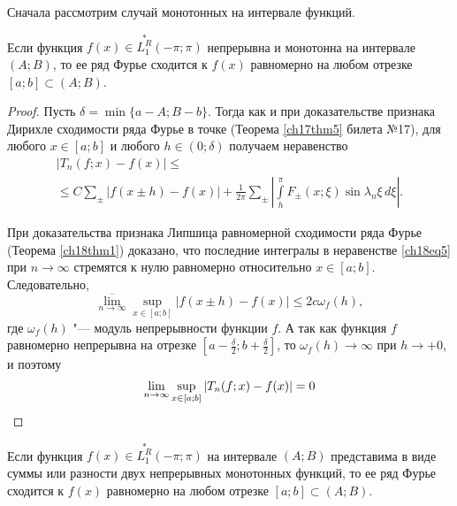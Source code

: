 Сначала рассмотрим случай монотонных на интервале функций.

\begin{thm} \label{ch18thm3}
Если функция $f(x) \in \overset{*}{L^{R}_1}(-\pi;\pi)$ непрерывна и монотонна на интервале $(A;B)$, то ее ряд Фурье сходится к $f(x)$ равномерно на любом отрезке $[a;b] \subset (A;B)$.
\end{thm}
\begin{proof}
Пусть $\delta = \min \{a - A; B - b\}$. Тогда как и при доказательстве признака Дирихле сходимости ряда Фурье в точке (Теорема \ref{ch17thm5} билета №17), для любого $x \in [a;b]$ и любого $h \in (0;\delta)$ получаем неравенство
\begin{multline} \label{ch18eq5}
|T_n(f; x) - f(x)| \le\\
\le C\sum_{\pm}|f(x \pm h) - f(x)| + \frac{1}{2\pi} \sum_{\pm} \left|\int\limits_{h}^{\pi} F_{\pm}(x; \xi) \sin{\lambda_n \xi} \,d\xi \right|.
\end{multline}

При доказательства признака Липшица равномерной сходимости ряда Фурье (Теорема \ref{ch18thm1}) доказано, что последние интегралы в неравенстве \eqref{ch18eq5} при $n \to \infty$ стремятся к нулю равномерно относительно $x \in [a;b]$. Следовательно,
$$
\overline{\lim\limits_{n \to \infty}} \sup \limits_{x \in [a;b]} |f(x \pm h) - f(x)| \le 2c\omega_{f}(h),
$$
где $\omega_{f}(h)$ "--- модуль непрерывности функции $f$. А так как функция $f$ равномерно непрерывна на отрезке $\left[a - \frac{\delta}{2}; b + \frac{\delta}{2}\right]$, то $\omega_{f}(h) \to \infty$ при $h \to +0$, и поэтому
\begin{equation*}
\lim\limits_{n \to \infty} \sup\limits_{x \in [a;b]} |T_n(f; x) - f(x)| = 0 \qedhere
\end{equation*}
\end{proof}
\begin{cons}
Если функция $f(x) \in \overset{*}{L^{R}_1}(-\pi;\pi)$ на интервале $(A;B)$ представима в виде суммы или разности двух непрерывных монотонных функций, то ее ряд Фурье сходится к $f(x)$ равномерно на любом отрезке $[a;b] \subset (A;B)$.
\end{cons}

